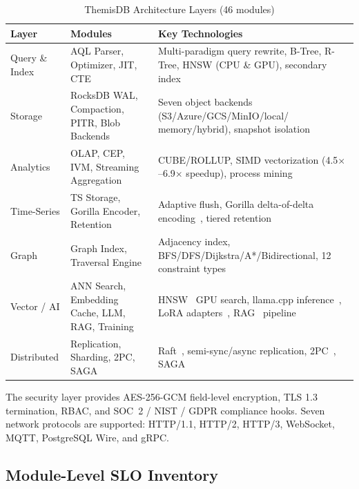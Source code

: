 \documentclass[conference]{IEEEtran}
\begin{document}
\begin{table}[t]
  \caption{ThemisDB Architecture Layers (46 modules)}
  \label{tab:arch}
  \centering
  \begin{tabular}{L{1.5cm}L{2.6cm}L{3.5cm}}
    \toprule
    \textbf{Layer} & \textbf{Modules} & \textbf{Key Technologies} \\
    \midrule
    Query \& Index &
      AQL Parser, Optimizer, JIT, CTE &
      Multi-paradigm query rewrite, B-Tree, R-Tree, HNSW
      (CPU \& GPU), secondary index \\
    \addlinespace
    Storage &
      RocksDB WAL, Compaction, PITR, Blob Backends &
      Seven object backends (S3/Azure/GCS/MinIO/local/
      memory/hybrid), snapshot isolation \\
    \addlinespace
    Analytics &
      OLAP, CEP, IVM, Streaming Aggregation &
      CUBE/ROLLUP, SIMD vectorization (4.5$\times$--6.9$\times$
      speedup), process mining \\
    \addlinespace
    Time-Series &
      TS Storage, Gorilla Encoder, Retention &
      Adaptive flush, Gorilla delta-of-delta
      encoding~\cite{Pelkonen2015}, tiered retention \\
    \addlinespace
    Graph &
      Graph Index, Traversal Engine &
      Adjacency index, BFS/DFS/Dijkstra/A*/Bidirectional,
      12 constraint types \\
    \addlinespace
    Vector / AI &
      ANN Search, Embedding Cache, LLM, RAG, Training &
      HNSW~\cite{Malkov2018} GPU search, llama.cpp
      inference~\cite{llamacpp2023}, LoRA adapters~\cite{Hu2022},
      RAG~\cite{Lewis2020} pipeline \\
    \addlinespace
    Distributed &
      Replication, Sharding, 2PC, SAGA &
      Raft~\cite{Ongaro2014}, semi-sync/async replication,
      2PC~\cite{Gray1978}, SAGA~\cite{Garcia-Molina1987} \\
    \bottomrule
  \end{tabular}
\end{table}

The security layer provides AES-256-GCM field-level encryption, TLS
1.3 termination, RBAC, and SOC~2 / NIST / GDPR compliance hooks.
Seven network protocols are supported: HTTP/1.1, HTTP/2, HTTP/3,
WebSocket, MQTT, PostgreSQL Wire, and gRPC.

\subsection{Module-Level SLO Inventory}
\label{ssec:slo-inventory}
\end{document}
